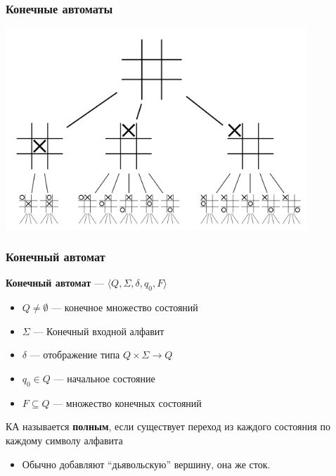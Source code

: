 \documentclass{beamer}
\begin{document}
\begin{frame}[fragile]
  \transwipe[direction=90]
  \frametitle{Конечные автоматы}
  \begin{center}
     \includegraphics[width=0.85\textwidth]{pics/tictac.jpg}  
   \end{center}
\end{frame}

\begin{frame}[fragile]
  \transwipe[direction=90]
  \frametitle{Конечный автомат}
  \textbf{Конечный автомат} --- $\langle Q, \Sigma, \delta, q_0, F \rangle$
  \begin{itemize}
    \item $Q \neq \emptyset$ --- конечное множество состояний
    \item $\Sigma$ --- Конечный входной алфавит
    \item $\delta$ --- отображение типа $Q \times \Sigma \rightarrow Q$
    \item $q_0 \in Q$ --- начальное состояние
    \item $F \subseteq Q$ --- множество конечных состояний
  \end{itemize}

  КА называется \textbf{полным}, если существует переход из каждого состояния по каждому символу алфавита
\begin{itemize}
    \item Обычно добавляют ``дьявольскую'' вершину, она же сток. 
\end{itemize}
\end{frame}
\end{document}
